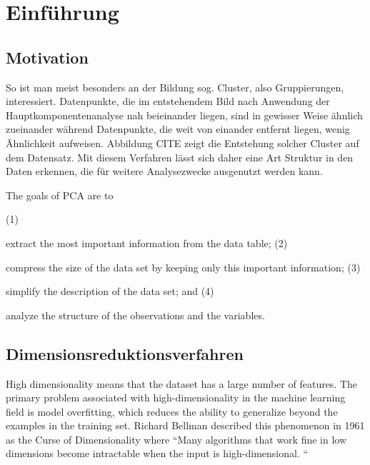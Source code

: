 \chapter{Einführung}

\cite{elad}
\cite{foucart}
\cite{hastie_elements}
\cite{gribonval}
\cite{jenatton}
\cite{johnstone}
\cite{yata}
\cite{mairal}
\cite{tibshirani_lasso}
\cite{tibshirani_uniqueness}
\cite{zou_elasticnet}
\cite{zou_sparsepca}
\cite{zou_overview}
\cite{efron_lars}

\label{introduction}

\section{Motivation}

So ist man meist besonders an der Bildung sog. Cluster, also Gruppierungen, interessiert. Datenpunkte, die im entstehendem Bild nach Anwendung der Hauptkomponentenanalyse nah beieinander liegen, sind in gewisser Weise ähnlich zueinander während Datenpunkte, die weit von einander entfernt liegen, wenig Ähnlichkeit aufweisen. Abbildung CITE zeigt die Entstehung solcher Cluster auf dem Datensatz. Mit diesem Verfahren lässt sich daher eine Art Struktur in den Daten erkennen, die für weitere Analysezwecke ausgenutzt werden kann.

The goals of PCA are to

    (1)

    extract the most important information from the data table;
    (2)

    compress the size of the data set by keeping only this important information;
    (3)

    simplify the description of the data set; and
    (4)

    analyze the structure of the observations and the variables.


\section{Dimensionsreduktionsverfahren}

High dimensionality means that the dataset has a large number of features. The primary problem associated with high-dimensionality in the machine learning field is model overfitting, which reduces the ability to generalize beyond the examples in the training set. Richard Bellman described this phenomenon in 1961 as the Curse of Dimensionality where “Many algorithms that work fine in low dimensions become intractable when the input is high-dimensional. “

